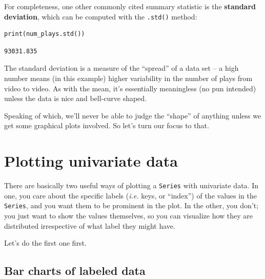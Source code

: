 
For completeness, one other commonly cited summary statistic is the
\textbf{standard deviation}, which can be computed with the \texttt{.std()}
method:

\begin{Verbatim}[fontsize=\small,samepage=true,frame=single,framesep=3mm]
print(num_plays.std())
\end{Verbatim}
\vspace{-.3in}

\begin{Verbatim}[fontsize=\small,samepage=true,frame=leftline,framesep=5mm,framerule=1mm]
93031.835
\end{Verbatim}

The standard deviation is a measure of the ``spread'' of a data set -- a high
number means (in this example) higher variability in the number of plays from
video to video. As with the mean, it's essentially meaningless (no pun
intended) unless the data is nice and bell-curve shaped.

Speaking of which, we'll never be able to judge the ``shape'' of anything
unless we get some graphical plots involved. So let's turn our focus to that.

\section{Plotting univariate data}

\label{twoWaysToPlotUnivariateData}

There are basically two useful ways of plotting a \texttt{Series} with
univariate data. In one, you care about the specific labels (\textit{i.e.}
keys, or ``index'') of the values in the \texttt{Series}, and you want them to
be prominent in the plot. In the other, you don't; you just want to show the
values themselves, so you can visualize how they are distributed irrespective
of what label they might have.

Let's do the first one first.

\subsection{Bar charts of labeled data}



